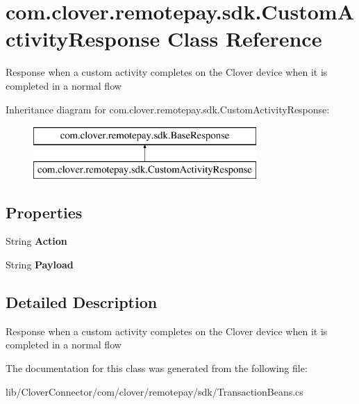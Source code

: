 \hypertarget{classcom_1_1clover_1_1remotepay_1_1sdk_1_1_custom_activity_response}{}\section{com.\+clover.\+remotepay.\+sdk.\+Custom\+Activity\+Response Class Reference}
\label{classcom_1_1clover_1_1remotepay_1_1sdk_1_1_custom_activity_response}


Response when a custom activity completes on the Clover device when it is completed in a normal flow  


Inheritance diagram for com.\+clover.\+remotepay.\+sdk.\+Custom\+Activity\+Response\+:\begin{figure}[H]
\begin{center}
\leavevmode
\includegraphics[height=2.000000cm]{classcom_1_1clover_1_1remotepay_1_1sdk_1_1_custom_activity_response}
\end{center}
\end{figure}
\subsection*{Properties}
\begin{DoxyCompactItemize}
\item 
\mbox{\label{classcom_1_1clover_1_1remotepay_1_1sdk_1_1_custom_activity_response_a10bbbb5aad053eb21bc6a4c51524a04e}} 
String {\bfseries Action}
\item 
\mbox{\label{classcom_1_1clover_1_1remotepay_1_1sdk_1_1_custom_activity_response_a11223ec6dbba1c9f09481e3ccfc2352c}} 
String {\bfseries Payload}
\end{DoxyCompactItemize}


\subsection{Detailed Description}
Response when a custom activity completes on the Clover device when it is completed in a normal flow 



The documentation for this class was generated from the following file\+:\begin{DoxyCompactItemize}
\item 
lib/\+Clover\+Connector/com/clover/remotepay/sdk/Transaction\+Beans.\+cs\end{DoxyCompactItemize}
